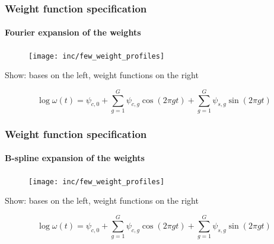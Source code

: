 \documentclass{snedecorbeamer}
\begin{document}
\begin{frame}
  \frametitle{Weight function specification}
  \framesubtitle{Fourier expansion of the weights}

  \begin{figure}
    \centering
    \texttt{[image: inc/few\_weight\_profiles]}
  \end{figure}

  Show: bases on the left, weight functions on the right

  \begin{equation}
    \log\omega(t)
    \label{eq:few-log}
    =\psi_{c,0} + \sum_{g = 1}^{G} \psi_{c,g}\cos\left(2\pi gt\right)
      + \sum_{g = 1}^{G} \psi_{s,g}\sin\left(2\pi gt\right)
  \end{equation}

\end{frame}

\begin{frame}
  \frametitle{Weight function specification}
  \framesubtitle{B-spline expansion of the weights}

  \begin{figure}
    \centering
    \texttt{[image: inc/few\_weight\_profiles]}
  \end{figure}

  Show: bases on the left, weight functions on the right

  \begin{equation}
    \log\omega(t)
    \label{eq:few-log}
    =\psi_{c,0} + \sum_{g = 1}^{G} \psi_{c,g}\cos\left(2\pi gt\right)
      + \sum_{g = 1}^{G} \psi_{s,g}\sin\left(2\pi gt\right)
  \end{equation}

\end{frame}
\end{document}

